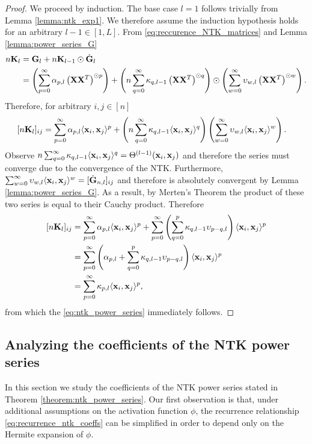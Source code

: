 \begin{proof}
   We proceed by induction. The base case $l=1$ follows trivially from Lemma \ref{lemma:ntk_exp1}. We therefore assume the induction hypothesis holds for an arbitrary $l-1 \in [1,L]$. From \eqref{eq:reccurence_NTK_matrices} and Lemma \ref{lemma:power_series_G}
   \[
   \begin{aligned}
   n\mathbf{K}_{l} &= \mathbf{G}_{l} + n\mathbf{K}_{l-1}\odot \dot{\mathbf{G}}_{l}\\
   &= \left(\sum_{p = 0}^{\infty} \alpha_{p,l}\left( \mathbf{X} \mathbf{X}^T\right)^{\odot p}\right) + \left(n \sum_{q=0}^{\infty} \kappa_{q,l-1}\left( \mathbf{X} \mathbf{X}^T \right)^{\odot q}\right)\odot \left(\sum_{w=0}^{\infty} \upsilon_{w,l}\left( \mathbf{X} \mathbf{X}^T \right)^{\odot w}\right).
   \end{aligned}
   \]
   Therefore, for arbitrary $i,j \in [n]$
   \[
   \begin{aligned}
   [n\mK_{l}]_{ij}
   &= \sum_{p = 0}^{\infty} \alpha_{p,l}\langle\vx_i, \vx_j \rangle^p + \left( n\sum_{q=0}^{\infty} \kappa_{q,l-1}\langle\vx_i, \vx_j \rangle^q\right) \left(\sum_{w=0}^{\infty} \upsilon_{w,l}\langle\vx_i, \vx_j \rangle^w\right).
   \end{aligned}
   \]
   Observe $n\sum_{q=0}^{\infty} \kappa_{q,l-1}\langle\mathbf x_i, \mathbf x_j \rangle^q = \Theta^{(l-1)}(\mathbf x_i, \mathbf x_j)$ and therefore the series must converge due to the convergence of the NTK. Furthermore, $\sum_{w=0}^{\infty} \upsilon_{w,l}\langle\mathbf x_i, \mathbf x_j \rangle^w = [\dot{\mathbf{G}}_{n,l}]_{ij}$ and therefore is absolutely convergent by Lemma \ref{lemma:power_series_G}. As a result, by Merten's Theorem the product of these two series is equal to their Cauchy product. Therefore
   \[
   \begin{aligned}
   [n\mK_{l}]_{ij}
   &= \sum_{p = 0}^{\infty} \alpha_{p,l}\langle\vx_i, \vx_j \rangle^p + \sum_{p=0}^{\infty} \left(\sum_{q = 0}^p \kappa_{q,l-1}\upsilon_{p-q,l} \right)\langle\vx_i, \vx_j \rangle^p\\
   &=\sum_{p = 0}^{\infty} \left( \alpha_{p,l} + \sum_{q = 0}^p \kappa_{q,l-1}\upsilon_{p-q,l}\right) \langle\vx_i, \vx_j \rangle^p\\
   & = \sum_{p = 0}^{\infty} \kappa_{p,l}\langle\vx_i, \vx_j \rangle^p,
   \end{aligned}
   \]
   from which the \eqref{eq:ntk_power_series} immediately follows.
\end{proof}


\subsection{Analyzing the coefficients of the NTK power series} \label{appendix:subsec:analyzing_ntk_coefficients}
In this section we study the coefficients of the NTK power series stated in Theorem \ref{theorem:ntk_power_series}. Our first observation is that, under additional assumptions on the activation function $\phi$, the recurrence relationship \eqref{eq:recurrence_ntk_coeffs} can be simplified in order to depend only on the Hermite expansion of $\phi$.

